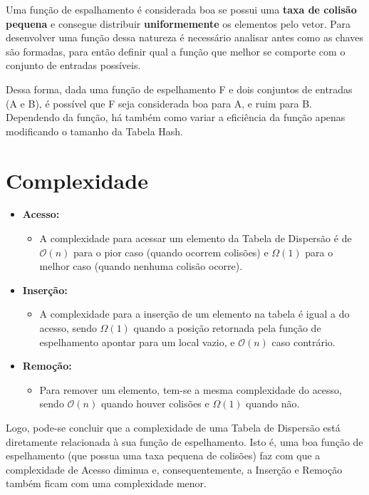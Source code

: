 \documentclass[12pt,openright,oneside,a4paper,english,brazil]{abntex2}
\begin{document}
    Uma função de espalhamento é considerada boa se possui uma \textbf{taxa de colisão pequena} e consegue distribuir \textbf{uniformemente} os elementos pelo vetor.
    Para desenvolver uma função dessa natureza é necessário analisar antes como as chaves são formadas, para então definir qual a função que melhor se comporte com o conjunto de entradas possíveis.

    Dessa forma, dada uma função de espelhamento F e dois conjuntos de entradas (A e B), é possível que F seja considerada boa para A, e ruim para B.
    Dependendo da função, há também como variar a eficiência da função apenas modificando o tamanho da Tabela Hash.

\section*{Complexidade}
    \begin{itemize}
        \item \textbf{Acesso:}
        \begin{itemize}[label={}]
            \item A complexidade para acessar um elemento da Tabela de Dispersão é de $\mathcal{O}(n)$ para o pior caso (quando ocorrem colisões) e $\Omega(1)$ para o melhor caso (quando nenhuma colisão ocorre).
        \end{itemize}
        \item \textbf{Inserção:}
        \begin{itemize}[label={}]
            \item A complexidade para a inserção de um elemento na tabela é igual a do acesso, sendo $\Omega(1)$ quando a posição retornada pela função de espelhamento apontar para um local vazio, e $\mathcal{O}(n)$ caso contrário.
        \end{itemize}
        \item \textbf{Remoção:}
        \begin{itemize}[label={}]
            \item Para remover um elemento, tem-se a mesma complexidade do acesso, sendo $\mathcal{O}(n)$ quando houver colisões e $\Omega(1)$ quando não.
        \end{itemize}
    \end{itemize}

    Logo, pode-se concluir que a complexidade de uma Tabela de Dispersão está diretamente relacionada à sua função de espelhamento. Isto é, uma boa função de espelhamento (que possua uma taxa pequena de colisões) faz com que a complexidade de Acesso diminua e, consequentemente, a Inserção e Remoção também ficam com uma complexidade menor.
\end{document}
